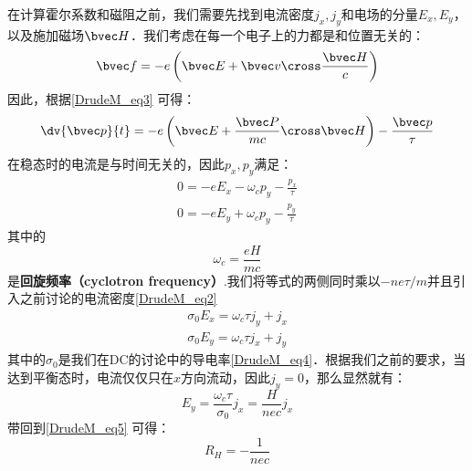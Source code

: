 在计算霍尔系数和磁阻之前，我们需要先找到电流密度$j_x,j_y$和电场的分量$E_x,E_y$，以及施加磁场$\bvec H$．我们考虑在每一个电子上的力都是和位置无关的：
\begin{equation}
\bvec f = -e\left(\bvec E +\bvec v\cross \frac{\bvec H}{c}\right)
\end{equation}
因此，根据\autoref{DrudeM_eq3} 可得：
\begin{equation}
\dv{\bvec p}{t}=-e\left(\bvec E +\frac{\bvec P}{mc}\cross \bvec H\right)-\frac{\bvec p}{\tau}
\end{equation}
在稳态时的电流是与时间无关的，因此$p_x,p_y$满足：
\begin{align}
0=-eE_x-\omega_c p_y -\frac{p_x}{\tau}\\
0=-eE_y+\omega_c p_y -\frac{p_y}{\tau}
\end{align}
其中的
\begin{equation}
\omega_c = \frac{eH}{mc}
\end{equation}
是\textbf{回旋频率（cyclotron frequency）}.我们将等式的两侧同时乘以$-ne\tau/m$并且引入之前讨论的电流密度\autoref{DrudeM_eq2} 
\begin{align}
\sigma_0 E_x = \omega_c \tau j_y+j_x\\
\sigma_0 E_y = \omega_c \tau j_x+j_y
\end{align}
其中的$\sigma_0$是我们在DC的讨论中的导电率\autoref{DrudeM_eq4}．根据我们之前的要求，当达到平衡态时，电流仅仅只在$x$方向流动，因此$j_y = 0$，那么显然就有：
\begin{equation}
 E_y = \frac{\omega_c \tau }{\sigma_0}j_x=\frac{H}{nec}j_x
\end{equation}
带回到\autoref{DrudeM_eq5} 可得：
\begin{equation}
R_H=-\frac{1}{nec}
\end{equation}

